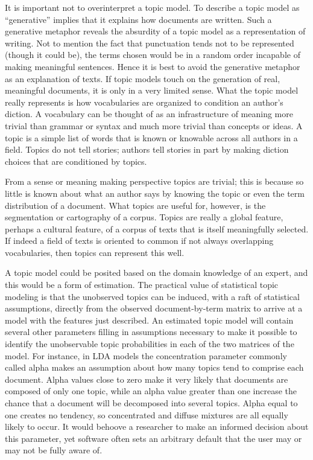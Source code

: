 \documentclass[]{book}
\theoremstyle{definition}
\theoremstyle{definition}
\theoremstyle{definition}
\theoremstyle{remark}
\begin{document}
It is important not to overinterpret a topic model. To describe a topic
model as ``generative'' implies that it explains how documents are
written. Such a generative metaphor reveals the absurdity of a topic
model as a representation of writing. Not to mention the fact that
punctuation tends not to be represented (though it could be), the terms
chosen would be in a random order incapable of making meaningful
sentences. Hence it is best to avoid the generative metaphor as an
explanation of texts. If topic models touch on the generation of real,
meaningful documents, it is only in a very limited sense. What the topic
model really represents is how vocabularies are organized to condition
an author's diction. A vocabulary can be thought of as an infrastructure
of meaning more trivial than grammar or syntax and much more trivial
than concepts or ideas. A topic is a simple list of words that is known
or knowable across all authors in a field. Topics do not tell stories;
authors tell stories in part by making diction choices that are
conditioned by topics.

From a sense or meaning making perspective topics are trivial; this is
because so little is known about what an author says by knowing the
topic or even the term distribution of a document. What topics are
useful for, however, is the segmentation or cartography of a corpus.
Topics are really a global feature, perhaps a cultural feature, of a
corpus of texts that is itself meaningfully selected. If indeed a field
of texts is oriented to common if not always overlapping vocabularies,
then topics can represent this well.

A topic model could be posited based on the domain knowledge of an
expert, and this would be a form of estimation. The practical value of
statistical topic modeling is that the unobserved topics can be induced,
with a raft of statistical assumptions, directly from the observed
document-by-term matrix to arrive at a model with the features just
described. An estimated topic model will contain several other
parameters filling in assumptions necessary to make it possible to
identify the unobservable topic probabilities in each of the two
matrices of the model. For instance, in LDA models the concentration
parameter commonly called alpha makes an assumption about how many
topics tend to comprise each document. Alpha values close to zero make
it very likely that documents are composed of only one topic, while an
alpha value greater than one increase the chance that a document will be
decomposed into several topics. Alpha equal to one creates no tendency,
so concentrated and diffuse mixtures are all equally likely to occur. It
would behoove a researcher to make an informed decision about this
parameter, yet software often sets an arbitrary default that the user
may or may not be fully aware of.
\end{document}
